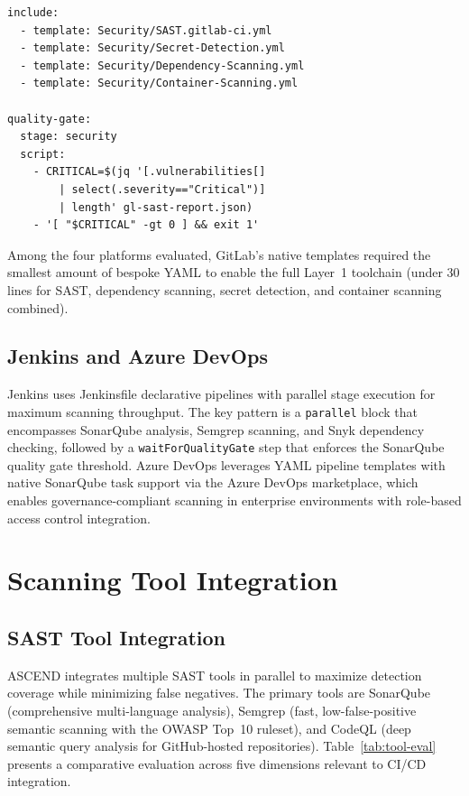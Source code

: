 \documentclass{ieeeaccess}
\begin{document}
\begin{small}
\begin{verbatim}
include:
  - template: Security/SAST.gitlab-ci.yml
  - template: Security/Secret-Detection.yml
  - template: Security/Dependency-Scanning.yml
  - template: Security/Container-Scanning.yml

quality-gate:
  stage: security
  script:
    - CRITICAL=$(jq '[.vulnerabilities[]
        | select(.severity=="Critical")]
        | length' gl-sast-report.json)
    - '[ "$CRITICAL" -gt 0 ] && exit 1'
\end{verbatim}
\end{small}

Among the four platforms evaluated, GitLab's native templates required the smallest amount of bespoke YAML to enable the full Layer~1 toolchain (under 30 lines for SAST, dependency scanning, secret detection, and container scanning combined).

\subsection{Jenkins and Azure DevOps}
Jenkins uses Jenkinsfile declarative pipelines with parallel stage execution for maximum scanning throughput. The key pattern is a \texttt{parallel} block that encompasses SonarQube analysis, Semgrep scanning, and Snyk dependency checking, followed by a \texttt{waitForQualityGate} step that enforces the SonarQube quality gate threshold. Azure DevOps leverages YAML pipeline templates with native SonarQube task support via the Azure DevOps marketplace, which enables governance-compliant scanning in enterprise environments with role-based access control integration.

\section{Scanning Tool Integration}
\label{sec:tools}

\subsection{SAST Tool Integration}
ASCEND integrates multiple SAST tools in parallel to maximize detection coverage while minimizing false negatives. The primary tools are SonarQube (comprehensive multi-language analysis), Semgrep (fast, low-false-positive semantic scanning with the OWASP Top~10 ruleset), and CodeQL (deep semantic query analysis for GitHub-hosted repositories). Table~\ref{tab:tool-eval} presents a comparative evaluation across five dimensions relevant to CI/CD integration.
\end{document}
